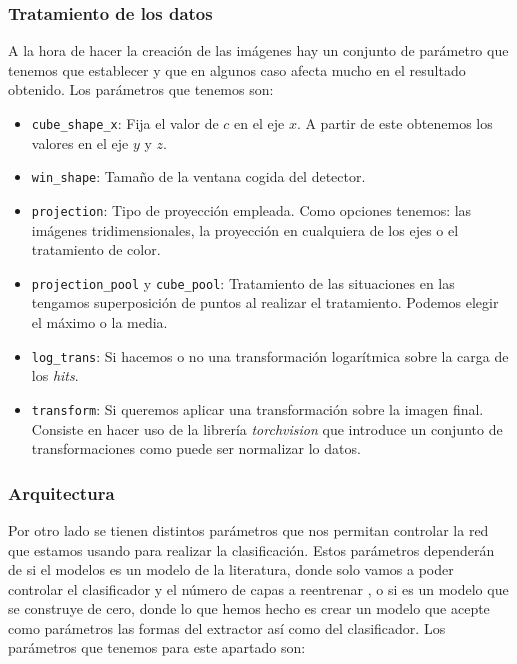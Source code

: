\documentclass[a4paper,12pt,twoside,titlepage]{article}
\newcommand{\inline}[1]{\texttt{#1}}
\begin{document}
\subsubsection*{Tratamiento de los datos}

A la hora de hacer la creación de las imágenes hay un conjunto de parámetro que tenemos que establecer y que en algunos caso afecta mucho en el resultado obtenido. Los parámetros que tenemos son:

\begin{itemize}
  \item \inline{cube_shape_x}: Fija el valor de $c$ en el eje $x$. A partir de este obtenemos los valores en el eje $y$ y $z$.
  \item \inline{win_shape}: Tamaño de la ventana cogida del detector.
  \item \inline{projection}: Tipo de proyección empleada. Como opciones tenemos:  las imágenes tridimensionales, la proyección en cualquiera de los ejes o el tratamiento de color.
  \item \inline{projection_pool} y \inline{cube_pool}: Tratamiento de las situaciones en las tengamos superposición de puntos al realizar el tratamiento. Podemos elegir el máximo o la media.
  \item \inline{log_trans}: Si hacemos o no una transformación logarítmica sobre la carga de los \textit{hits}.
  \item \inline{transform}: Si queremos aplicar una transformación sobre la imagen final. Consiste en hacer uso de la librería \textit{torchvision} que introduce un conjunto de transformaciones como puede ser normalizar lo datos.
\end{itemize}

\subsubsection*{Arquitectura}

Por otro lado se tienen distintos parámetros que nos permitan controlar la red que estamos usando para realizar la clasificación. Estos parámetros dependerán de si el modelos es un modelo de la literatura, donde solo vamos a poder controlar el clasificador y el número de capas a reentrenar , o si es un modelo que se construye de cero, donde lo que hemos hecho es crear un modelo que acepte como parámetros las formas del extractor así como del clasificador. Los parámetros que tenemos para este apartado son:
\end{document}
